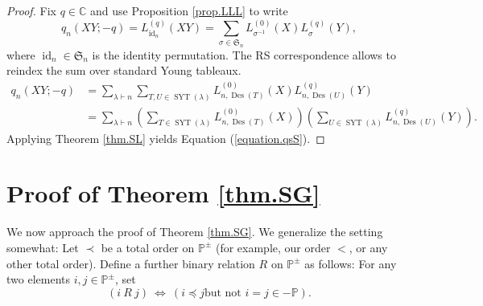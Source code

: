 \documentclass[revision]{FPSAC2024}
\newcommand{\la}{\lambda}
\newcommand{\CC}{\mathbb{C}} %
\newcommand{\PP}{\mathbb{P}} %
\newcommand{\id}{\operatorname{id}} %
\newcommand{\SYT}{\operatorname{SYT}}
\newcommand{\Des}{\operatorname{Des}}
\begin{document}
\begin{proof}
Fix $q \in \CC$ and use Proposition \ref{prop.LLL} to write 
\begin{equation*}
q_{n}(XY;-q) = L_{\id_n}^{(q)}(XY) = \sum_{\sigma \in \mathfrak{S}_n}L_{\sigma^{-1}}^{(0)}(X)L_{\sigma\phantom{^{-1}}}^{(q)}\!\!(Y),
\end{equation*}
where $\id_n \in \mathfrak{S}_n$ is the identity permutation. The RS correspondence allows to reindex the sum over standard Young tableaux.
\begin{align*}
q_{n}(XY;-q) &=\sum_{\la \vdash n} \sum_{T, U \in \SYT(\la)}L_{n, \Des(T)}^{(0)}(X)L_{n, \Des(U)}^{(q)}(Y)\\
&=\sum_{\la \vdash n} \left(\sum_{T \in \SYT(\la)}L_{n, \Des(T)}^{(0)}(X)\right)\left(\sum_{U \in \SYT(\la)}L_{n, \Des(U)}^{(q)}(Y)\right).
\end{align*}
Applying Theorem \ref{thm.SL} yields Equation (\ref{equation.qsS}).
\end{proof}
\section{Proof of Theorem \ref{thm.SG}}
\label{section.proof}
We now approach the proof of Theorem \ref{thm.SG}.
We generalize the setting somewhat:
Let $\prec$ be a total order on $\PP^\pm$
(for example, our order $<$, or any other total order).
Define a further binary relation $R$ on $\PP^\pm$ as follows:
For any two elements $i,j\in\mathbb{P}^{\pm}$, set%
\[
\left(  i\ R\ j\right)  \ \Longleftrightarrow\ \left(  i\preccurlyeq j\text{
but not }i=j\in-\mathbb{P}\right)  .
\]
\end{document}
